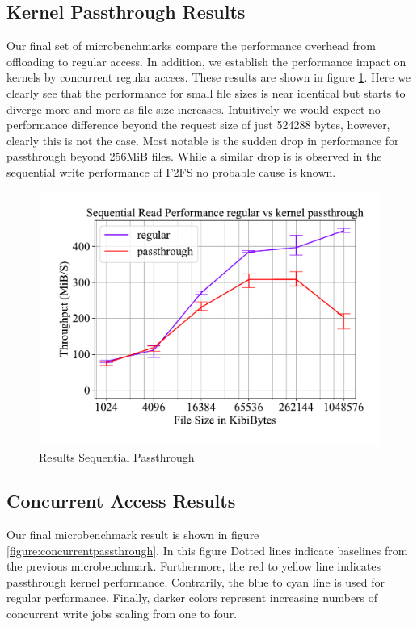 \subsection{Kernel Passthrough Results}

Our final set of microbenchmarks compare the performance overhead from
offloading to regular access. In addition, we establish the performance impact
on kernels by concurrent regular accees. These results are shown in figure
\ref{figure:passthroughresults}. Here we clearly see that the performance
for small file sizes is near identical but starts to diverge more and more
as file size increases. Intuitively we would expect no performance difference
beyond the request size of just 524288 bytes, however, clearly this is not the
case. Most notable is the sudden drop in performance for passthrough beyond
256MiB files. While a similar drop is is observed in the sequential write
performance of F2FS no probable cause is known.

\begin{figure}[h]
    \centering
	\includegraphics[width=1\textwidth]{resources/images/results-passthrough.pdf}
	\caption{Results Sequential Passthrough}
    \label{figure:passthroughresults}
\end{figure}

\subsection{Concurrent Access Results}

Our final microbenchmark result is shown in figure
\ref{figure:concurrentpassthrough}. In this figure Dotted lines indicate
baselines from the previous microbenchmark. Furthermore, the red to yellow line
indicates passthrough kernel performance. Contrarily, the blue to cyan line is
used for regular performance. Finally, darker colors represent increasing
numbers of concurrent write jobs scaling from one to four.

